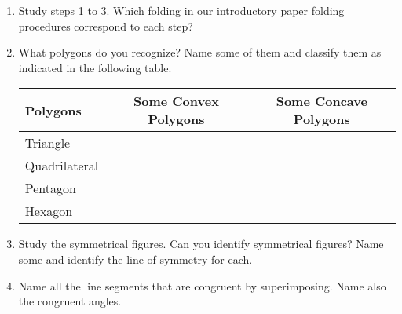 \begin{enumerate}[A.]
	\begin{enumerate}
	\item Study steps 1 to 3. Which folding in our introductory paper folding procedures correspond to each step? 
	\item What polygons do you recognize? Name some of them and classify them as indicated in the following table.
	\begin{center}
	\begin{tabular}{lcc}
	\hline \hline
	Polygons & Some Convex Polygons & Some Concave Polygons\\
	\hline 
	Triangle & & \\
	Quadrilateral & & \\
	Pentagon & & \\
	Hexagon & & \\
	\hline 
	\end{tabular}
	\end{center}
	\item Study the symmetrical figures. Can you identify symmetrical figures? Name some and identify the line of symmetry for each.
	\item Name all the line segments that are congruent by superimposing. Name also the congruent angles.
	\end{enumerate}
\end{enumerate}